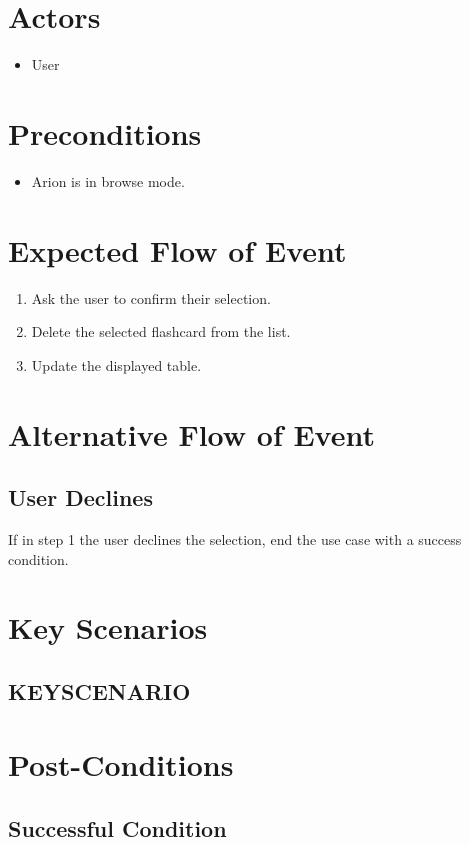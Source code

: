 \documentclass{scrreprt}
\begin{document}
\section{Actors}
\begin{itemize}
    \item User
\end{itemize}

\section{Preconditions}
\begin{itemize}
    \item Arion is in browse mode.
\end{itemize}

\section{Expected Flow of Event}
\begin{enumerate}[1.]
    \item Ask the user to confirm their selection.
    \item Delete the selected flashcard from the list.
    \item Update the displayed table.
\end{enumerate}

\section{Alternative Flow of Event}

    \subsection{User Declines}
    If in step 1 the user declines the selection,
    end the use case with a success condition.

\section{Key Scenarios}
    \subsection{KEYSCENARIO}

\section{Post-Conditions}
    \subsection{Successful Condition}
    
\end{document}
